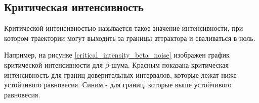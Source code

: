 \subsection{Критическая интенсивность}

    Критической интенсивностью называется такое значение интенсивности, при котором траектории могут выходить за границы аттрактора и сваливаться в ноль.

    Например, на рисунке \ref{critical_intensity_beta_noise} изображен график критической интенсивности для \(\beta\)-шума. Красным показана критическая интенсивность для границ доверительных интервалов, которые лежат ниже устойчивого равновесия. Синим - для границ, которые выше устойчивого равновесия. 


